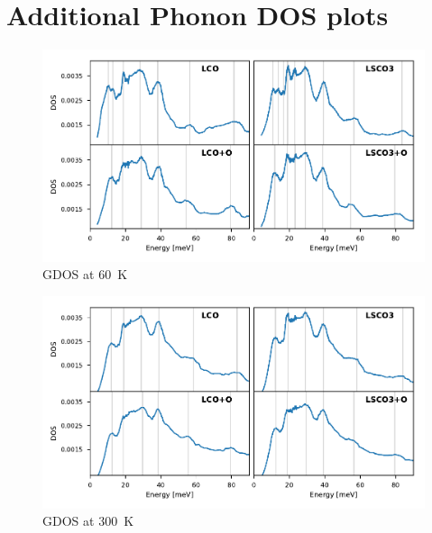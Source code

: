 \chapter{Additional Phonon DOS plots}\label{app:pdos_plots}

\begin{figure}
    \centering
    \includegraphics[width=\textwidth]{fig/gdos/in4_60K.pdf}
    \caption[gDOS at \SI{60}{\kelvin}]{GDOS at \SI{60}{\kelvin}}
    \label{fig:gdos_60k}
\end{figure}

\begin{figure}
    \centering
    \includegraphics[width=\textwidth]{fig/gdos/in4_300K.pdf}
    \caption[gDOS at \SI{300}{\kelvin}]{GDOS at \SI{300}{\kelvin}}
    \label{fig:gdos_300k}
\end{figure}